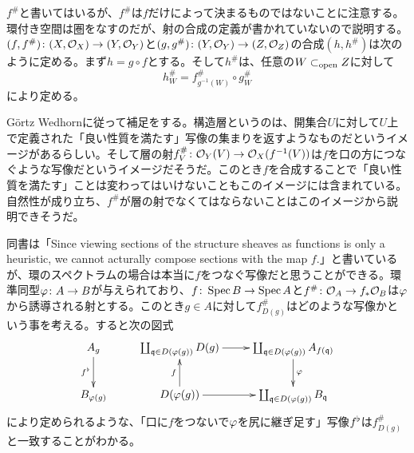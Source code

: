 \begin{rem}
  $f^{\#}$と書いてはいるが、$f^{\#}$は$f$だけによって決まるものではないことに注意する。環付き空間は圏をなすのだが、射の合成の定義が書かれていないので説明する。$(f,f^{\#}) \colon (X,\mathcal{O}_X) \to (Y,\mathcal{O}_Y)$と$(g,g^{\#}) \colon (Y,\mathcal{O}_Y) \to (Z,\mathcal{O}_Z)$の合成$(h,h^{\#})$は次のように定める。まず$h = g \circ f$とする。そして$h^{\#}$は、任意の$W \subset_{\text{open}} Z$に対して
  \[
  h^{\#}_W = f^{\#}_{g^{-1}(W)} \circ g^{\#}_W
  \]
  により定める。
\end{rem}

\begin{rem}
  G\"{o}rtz Wedhorn\cite{GW}に従って補足をする。構造層というのは、開集合$U$に対して$U$上で定義された「良い性質を満たす」写像の集まりを返すようなものだというイメージがあるらしい。そして層の射$f^{\#}_V \colon \mathcal{O}_Y(V) \to \mathcal{O}_X(f^{-1}(V)) $は$f$を口の方につなぐような写像だというイメージだそうだ。このとき$f$を合成することで「良い性質を満たす」ことは変わってはいけないこともこのイメージには含まれている。自然性が成り立ち、$f^{\#}$が層の射でなくてはならないことはこのイメージから説明できそうだ。

  同書は「Since viewing sections of the structure sheaves as functions is only a heuristic, we cannot acturally compose sections with the map $f$.」と書いているが、環のスペクトラムの場合は本当に$f$をつなぐ写像だと思うことができる。環準同型${\varphi} \colon A \to B$が与えられており、$f \colon \operatorname{Spec} B \to \operatorname{Spec} A$と$f^{\#} \colon \mathcal{O}_A \to f_* \mathcal{O}_B$は${\varphi}$から誘導される射とする。このとき$g \in A$に対して$f^{\#}_{D(g)}$はどのような写像かという事を考える。すると次の図式
  \[
  \xymatrix{
  A_g \ar[d]_{f\fl} & \coprod_{\frakq \in D(\vp(g))} D(g) \ar[r]  &  \coprod_{\frakq \in D(\vp(g))} A_{f(\frakq)} \ar[d]^-{\vp} \\
B_{\vp(g)} & D(\vp(g)) \ar[r] \ar[u]^-f & \coprod_{\frakq \in D(\vp(g))} B_{\frakq}
  }
  \]
  により定められるような、「口に$f$をつないで${\varphi}$を尻に継ぎ足す」写像$f^{\flat}$は$f^{\#}_{D(g)} $と一致することがわかる。
\end{rem}





